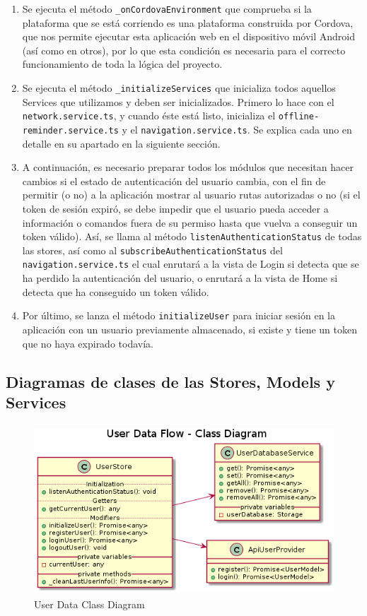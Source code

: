\begin{enumerate}
\item Se ejecuta el método \verb|_onCordovaEnvironment| que comprueba si la plataforma que se está corriendo es una plataforma construida por Cordova, que nos permite ejecutar esta aplicación web en el dispositivo móvil Android (así como en otros), por lo que esta condición es necesaria para el correcto funcionamiento de toda la lógica del proyecto.
\item Se ejecuta el método \verb|_initializeServices| que inicializa todos aquellos Services que utilizamos y deben ser inicializados. Primero lo hace con el \verb|network.service.ts|, y cuando éste está listo, inicializa el \verb|offline-reminder.service.ts| y el \verb|navigation.service.ts|. Se explica cada uno en detalle en su apartado en la siguiente sección.
\item A continuación, es necesario preparar todos los módulos que necesitan hacer cambios si el estado de autenticación del usuario cambia, con el fin de permitir (o no) a la aplicación mostrar al usuario rutas autorizadas o no (si el token de sesión expiró, se debe impedir que el usuario pueda acceder a información o comandos fuera de su permiso hasta que vuelva a conseguir un token válido). Así, se llama al método \verb|listenAuthenticationStatus| de todas las stores, así como al \verb|subscribeAuthenticationStatus| del \verb|navigation.service.ts| el cual enrutará a la vista de Login si detecta que se ha perdido la autenticación del usuario, o enrutará a la vista de Home si detecta que ha conseguido un token válido.
\item Por último, se lanza el método \verb|initializeUser| para iniciar sesión en la aplicación con un usuario previamente almacenado, si existe y tiene un token que no haya expirado todavía.
\end{enumerate}

\subsection{Diagramas de clases de las Stores, Models y Services}
\label{ch:Capitulo4.6.5}

\begin{figure}[hbt!]
\centering
\includegraphics[height=2.5in]{figures/diagrams/front/data-flow/user.png}
\caption[user]{User Data Class Diagram\footnotemark}
\end{figure}

